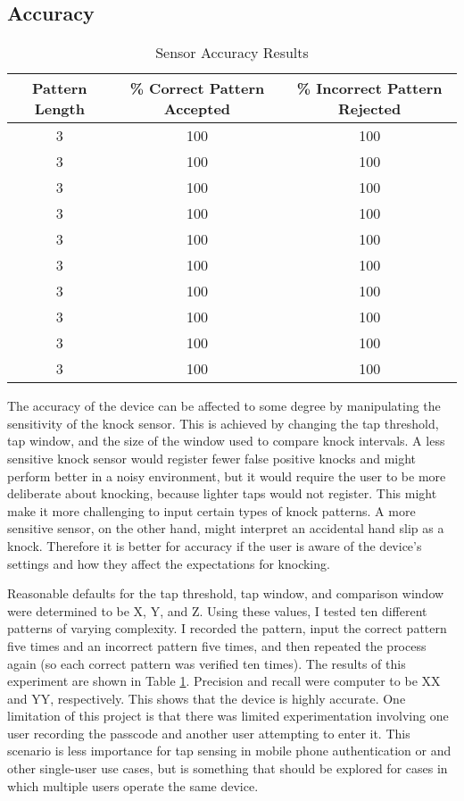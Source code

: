\documentclass[conference]{./IEEEtran}
\begin{document}
\subsection{Accuracy}
\begin{table}
\label{accuracy_table}
\centering
\begin{tabular}{ccc}
Pattern Length & \% Correct Pattern Accepted & \% Incorrect Pattern Rejected\\
\hline
3 & 100 & 100\\
3 & 100 & 100\\
3 & 100 & 100\\
3 & 100 & 100\\
3 & 100 & 100\\
3 & 100 & 100\\
3 & 100 & 100\\
3 & 100 & 100\\
3 & 100 & 100\\
3 & 100 & 100\\
\hline
\end{tabular}
\vspace{2mm}
\caption{Sensor Accuracy Results}
\end{table}

The accuracy of the device can be affected to some degree by manipulating the sensitivity of the knock sensor. This is achieved by changing the tap threshold, tap window, and the size of the window used to compare knock intervals. A less sensitive knock sensor would register fewer false positive knocks and might perform better in a noisy environment, but it would require the user to be more deliberate about knocking, because lighter taps would not register. This might make it more challenging to input certain types of knock patterns. A more sensitive sensor, on the other hand, might interpret an accidental hand slip as a knock. Therefore it is better for accuracy if the user is aware of the device's settings and how they affect the expectations for knocking. 

Reasonable defaults for the tap threshold, tap window, and comparison window were determined to be X, Y, and Z. Using these values, I tested ten different patterns of varying complexity. I recorded the pattern, input the correct pattern five times and an incorrect pattern five times, and then repeated the process again (so each correct pattern was verified ten times). The results of this experiment are shown in Table \ref{accuracy_table}. Precision and recall were computer to be XX and YY, respectively. This shows that the device is highly accurate. One limitation of this project is that there was limited experimentation involving one user recording the passcode and another user attempting to enter it. This scenario is less importance for tap sensing in mobile phone authentication or and other single-user use cases, but is something that should be explored for cases in which multiple users operate the same device. 
\end{document}
